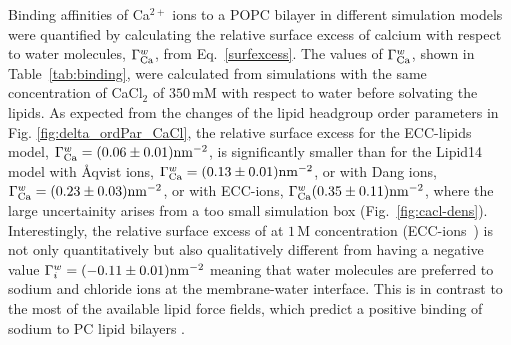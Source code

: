 \documentclass[aip,jcp,twocolumn]{revtex4}
\begin{document}
Binding affinities of Ca$^{2+}$ ions to a POPC bilayer in different simulation 
models were quantified by calculating the relative surface excess of calcium with respect to water molecules, $\Gamma_{\rm Ca}^w$, from Eq.~\ref{surfexcess}.
The values of $\Gamma_{\rm Ca}^w$, shown in Table~\ref{tab:binding},
were calculated from simulations with the same concentration of CaCl$_2$ of $350\,\mathrm{mM}$  with 
respect to water before solvating the lipids.
As expected from the changes of the lipid headgroup order parameters in Fig. \ref{fig:delta_ordPar_CaCl}, 
the relative surface excess for the ECC-lipids model, $\Gamma_{\rm Ca}^w = (0.06 \pm 0.01) \rm{nm}^{-2}$,
is significantly smaller than for the Lipid14 model with \AA{}qvist ions, $\Gamma_{\rm Ca}^w = (0.13 \pm 0.01) \rm{nm}^{-2}$,
or with Dang ions, $\Gamma_{\rm Ca}^w = (0.23 \pm 0.03) \rm{nm}^{-2}$,
or with ECC-ions,  $\Gamma_{\rm Ca}^w (0.35 \pm 0.11) \rm{nm}^{-2}$,
where the large uncertainity arises from a too small simulation box (Fig.~\ref{fig:cacl-dens}).
Interestingly, the relative surface excess of 
 at $1\,\mathrm{M}$ concentration (ECC-ions~\cite{Pluharova2014}) 
is not only quantitatively but also qualitatively different from 
having a negative value $\Gamma_i^w = (-0.11 \pm 0.01) \rm{nm}^{-2}$ 
meaning that water molecules are preferred to sodium and chloride ions at the membrane-water interface. 
This is in contrast to the most of the available lipid force fields,
which predict a positive binding of sodium to
PC lipid bilayers \cite{catte16}.
%
%
\end{document}
